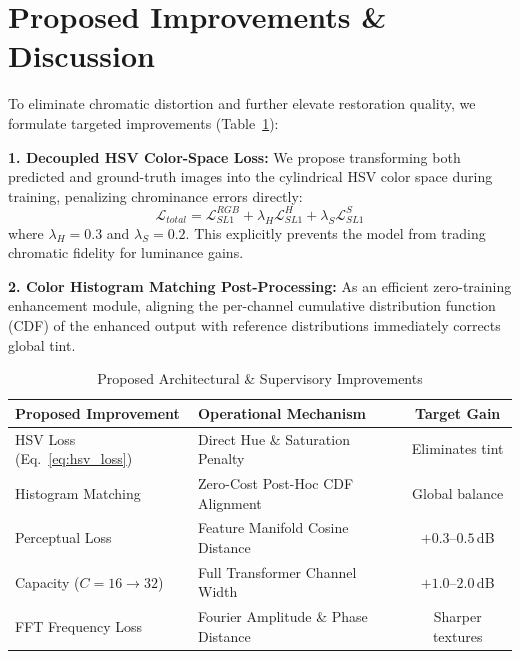 \documentclass[conference]{IEEEtran}
\begin{document}
\section{Proposed Improvements \& Discussion}
\label{sec:improvements}

To eliminate chromatic distortion and further elevate restoration quality, we formulate targeted improvements (Table~\ref{tab:improvements}):

\textbf{1. Decoupled HSV Color-Space Loss:} We propose transforming both predicted and ground-truth images into the cylindrical HSV color space during training, penalizing chrominance errors directly:
\begin{equation}
  \mathcal{L}_{total} = \mathcal{L}_{SL1}^{RGB} + \lambda_H \mathcal{L}_{SL1}^{H} + \lambda_S \mathcal{L}_{SL1}^{S}
  \label{eq:hsv_loss}
\end{equation}
where $\lambda_H=0.3$ and $\lambda_S=0.2$. This explicitly prevents the model from trading chromatic fidelity for luminance gains.

\textbf{2. Color Histogram Matching Post-Processing:} As an efficient zero-training enhancement module, aligning the per-channel cumulative distribution function (CDF) of the enhanced output with reference distributions immediately corrects global tint.

\begin{table}[t]
  \centering
  \caption{Proposed Architectural \& Supervisory Improvements}
  \label{tab:improvements}
  \footnotesize
  \begin{tabular}{llc}
    \toprule
    Proposed Improvement & Operational Mechanism & Target Gain \\
    \midrule
    HSV Loss (Eq.~\ref{eq:hsv_loss}) & Direct Hue \& Saturation Penalty & Eliminates tint \\
    Histogram Matching & Zero-Cost Post-Hoc CDF Alignment & Global balance \\
    Perceptual Loss~\cite{zhang2018unreasonable} & Feature Manifold Cosine Distance & $+0.3$--$0.5$\,dB \\
    Capacity ($C=16\to32$) & Full Transformer Channel Width & $+1.0$--$2.0$\,dB \\
    FFT Frequency Loss & Fourier Amplitude \& Phase Distance & Sharper textures \\
    \bottomrule
  \end{tabular}
\end{table}

\end{document}
